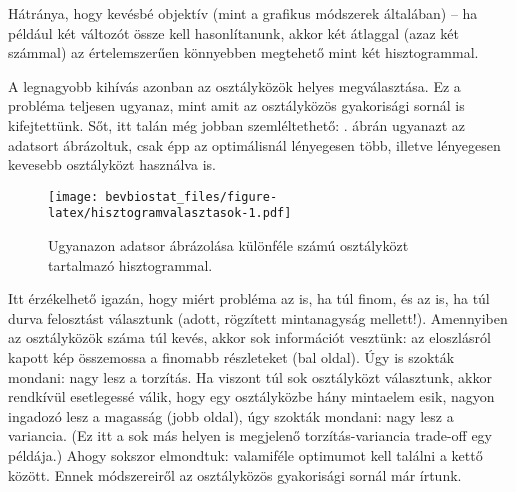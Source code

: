\documentclass[
]{book}
\newenvironment{Shaded}{\begin{snugshade}}{\end{snugshade}}
\newcommand{\AttributeTok}[1]{\textcolor[rgb]{0.77,0.63,0.00}{#1}}
\newcommand{\DecValTok}[1]{\textcolor[rgb]{0.00,0.00,0.81}{#1}}
\newcommand{\FunctionTok}[1]{\textcolor[rgb]{0.00,0.00,0.00}{#1}}
\newcommand{\NormalTok}[1]{#1}
\newcommand{\SpecialCharTok}[1]{\textcolor[rgb]{0.00,0.00,0.00}{#1}}
\newcommand{\StringTok}[1]{\textcolor[rgb]{0.31,0.60,0.02}{#1}}
\begin{document}
Hátránya, hogy kevésbé objektív (mint a grafikus módszerek általában) -- ha például két változót össze kell hasonlítanunk, akkor két átlaggal (azaz két számmal) az értelemszerűen könnyebben megtehető mint két hisztogrammal.

A legnagyobb kihívás azonban az osztályközök helyes megválasztása. Ez a probléma teljesen ugyanaz, mint amit az osztályközös gyakorisági sornál is kifejtettünk. Sőt, itt talán még jobban szemléltethető: . ábrán ugyanazt az adatsort ábrázoltuk, csak épp az optimálisnál lényegesen több, illetve lényegesen kevesebb osztályközt használva is.

\begin{Shaded}
\end{Shaded}

\begin{figure}
\centering
\texttt{[image: bevbiostat\_files/figure-latex/hisztogramvalasztasok-1.pdf]}
\caption{\label{fig:hisztogramvalasztasok}Ugyanazon adatsor ábrázolása különféle számú osztályközt tartalmazó hisztogrammal.}
\end{figure}

Itt érzékelhető igazán, hogy miért probléma az is, ha túl finom, és az is, ha túl durva felosztást választunk (adott, rögzített mintanagyság mellett!). Amennyiben az osztályközök száma túl kevés, akkor sok információt vesztünk: az eloszlásról kapott kép összemossa a finomabb részleteket (bal oldal). Úgy is szokták mondani: nagy lesz a torzítás. Ha viszont túl sok osztályközt választunk, akkor rendkívül esetlegessé válik, hogy egy osztályközbe hány mintaelem esik, nagyon ingadozó lesz a magasság (jobb oldal), úgy szokták mondani: nagy lesz a variancia. (Ez itt a sok más helyen is megjelenő torzítás-variancia trade-off egy példája.) Ahogy sokszor elmondtuk: valamiféle optimumot kell találni a kettő között. Ennek módszereiről az osztályközös gyakorisági sornál már írtunk.
\end{document}
